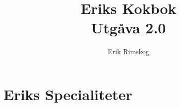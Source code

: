 \documentclass[12pt,a4paper]{article}
\title{\Huge Eriks Kokbok\\\medskip
  \large Utgåva 2.0\\\smallskip
  \small\texttt\shortHEAD}
\author{Erik Rimskog}
\begin{document}
\maketitle
\thispagestyle{empty}
\newpage
\tableofcontents
\newpage
\part{Eriks Specialiteter}



\end{document}
